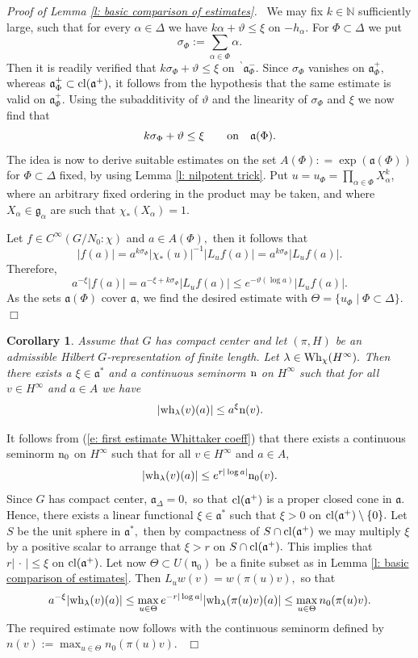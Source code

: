 \documentclass[12pt,a4paper]{article}
\newtheorem{Cor}[Thm]{Corollary}
\newenvironment{cor}[0]{\begin{Cor}\noindent}%
{\end{Cor}}
\def\proof{\par\noindent{\it Proof.}{\ }{\ }}
\def\qed{~\hfill\hbox{$\Box$}\medbreak}
\def\medno{\medbreak\noindent}
\def\qquad{\quad\quad}
\def\msy#1{{\mathbb #1}}
\def\N{{\msy N}}
\def\ga{\alpha}
\def\gl{\lambda}
\def\gs{\sigma}
\def\gD{\Delta}
\def\got#1{\mathfrak #1}
\def\fa{{\got a}}
\def\fg{{\got g}}
\def\fn{{\got n}}
\numberwithin{Thm}{section}
\numberwithin{equation}{section}
\def\dotvar{\, \cdot\,}
\def\Wh{{\rm Wh}}
\numberwithin{equation}{section}
\def\fad{{\fa^*}}
\def\cl{{\rm cl}}
\def\bp{\!{\,}^\backprime}
\def\wh{{\rm wh}}
\def\col{\!:\!}
\def\cchi{\chi}
\begin{document}
\medno
{\em Proof of Lemma \ref{l: basic comparison of estimates}.\ }
We may fix $k \in \N$ sufficiently large, such that for every $\ga \in 
\gD$ we have $k \ga +  \vartheta \leq \xi$ on $- h_\ga.$  For $\Phi \subset \gD$ we put 
$$ 
\gs_\Phi:= \sum_{\ga \in \Phi} \ga.
$$%
Then it is readily verified that $k\gs_\Phi + \vartheta \leq \xi$ on 
$\bp\fa_{\Phi}^{-}$. Since $\gs_\Phi$ vanishes on $\fa_\Phi^+,$ whereas $\fa_\Phi^+\subset \cl(\fa^+),$
it follows from the hypothesis that the same estimate is valid on $\fa_\Phi^+.$ Using the subadditivity 
of $\vartheta$ and the linearity of $\gs_\Phi$ and $\xi$ we now find that 
\begin{equation}
\label{e: estimate r versus xi}
 k \gs_\Phi  + \vartheta \leq \xi \qquad{\rm on}\quad \fa(\Phi).
\end{equation}
The idea is now to derive  suitable estimates on the set $A(\Phi): = \exp (\fa(\Phi))$ 
for $\Phi \subset \gD$ fixed, by using Lemma \ref{l: nilpotent trick}.
Put $u=u_\Phi= \prod_{\ga \in \Phi} X_\ga^k$, where an arbitrary fixed ordering in the product
may be taken, and where $X_\ga \in \fg_\ga$ are such that $\cchi_*(X_\ga) =1.$ 

Let  $f\in C^\infty(G/N_0\col \cchi)$ and $a  \in A(\Phi),$ then it follows that 
$$ 
|f(a)| = a^{k\gs_\Phi} |\cchi_*(u)|^{-1} |L_u f(a)|= a^{k\gs_\Phi} |L_u f(a)|.
$$%
Therefore, 
$$ 
a^{-\xi} |f(a)| = a^{-\xi + k\gs_\Phi } |L_u f(a)| \leq 
e^{-\vartheta(\log a)} |L_{u} f(a)|.
$$%
As the sets $\fa(\Phi)$ cover $\fa$, we find 
the desired estimate with $\Theta= \{ u_\Phi\mid \Phi\subset \gD\}.$
\qed

\begin{cor}
\label{c: estimate whittaker coeff with xi}
Assume that $G$ has compact center and let $(\pi, H)$ be an admissible Hilbert $G$-representation of finite length.  Let $\gl \in \Wh_\cchi(H^\infty).$ Then there
exists a $\xi \in \fad$ and a continuous seminorm ${\rm n}$ on $H^\infty$ such that 
for all $v \in H^\infty$ and $a \in A$ we have 
$$ 
|\wh_\gl(v)(a)| \leq a^\xi {\rm n}(v).
$$%
\end{cor}

\proof 
It follows from (\ref{e: first estimate Whittaker coeff}) that there exists a continuous
seminorm ${\rm n_0}$ on $H^\infty$ 
such that for all $v \in H^\infty$ and $a \in A,$ 
$$ 
|\wh_\gl(v)(a)| \leq e^{r|\log a|} {\rm n}_0(v) . 
$$%
Since $G$ has compact center, $\fa_\gD = 0,$ so that $\cl(\fa^+)$ 
is a proper closed cone in $\fa.$ Hence, there
exists a linear functional $\xi \in \fad$ such that $\xi > 0$ on $\cl(\fa^+)\setminus \{0\}.$ 
Let $S$ be the unit sphere in $\fad,$ then by compactness of $S \cap \cl(\fa^+)$ we may 
multiply $\xi$ by a positive scalar to arrange that $\xi > r$ on $S \cap \cl(\fa^+).$ 
This implies that  $r |\dotvar| \leq \xi$ 
on $\cl(\fa^+)$. Let now $\Theta \subset U(\fn_0)$ 
be a finite subset as in Lemma \ref{l: basic comparison of estimates}.
Then $L_u w (v) = w( \pi(u) v),$ so that 
$$
a^{-\xi} |\wh_\gl (v)(a)|  \leq \max_{u\in \Theta} e^{- r |\log a|} |\wh_\gl(\pi (u)v)(a)|
\leq 
\max_{u\in \Theta} n_0(\pi (u)v).
$$%
The required estimate now follows with the continuous seminorm defined by 
$n(v):= \max_{u\in \Theta}n_0(\pi(u)v).$ 
\qed
\end{document}

